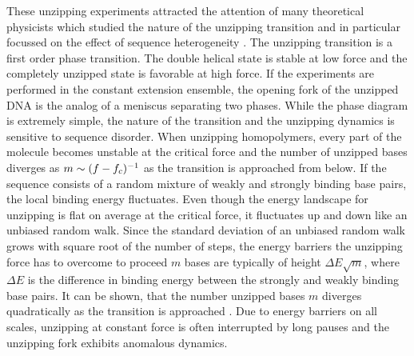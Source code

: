 These unzipping experiments attracted the attention of many theoretical physicists which
studied the nature of the unzipping transition \cite{Lubensky_PRL_00} and in particular
focussed on the effect of sequence heterogeneity \cite{Lubensky_PRE_02,Cocco_PRE_02,Danilowicz_PNAS_03}.
The unzipping transition is a first order phase transition. The double helical state is 
stable at low force and the completely unzipped state is favorable at high force. If the experiments
are performed in the constant extension ensemble, the opening fork of the unzipped DNA
is the analog of a meniscus separating two phases. While the phase diagram is extremely simple,
the nature of the transition and the unzipping dynamics is sensitive to sequence disorder.
When unzipping homopolymers, every part of the molecule becomes unstable at the critical force
and  the number of unzipped bases diverges as $m\sim (f-{f_c})^{-1}$ as the
transition is approached from below.  If the sequence consists of a random mixture of weakly and
strongly binding base pairs, the local binding energy fluctuates. Even though the energy landscape 
for unzipping is flat on average at the critical force, it fluctuates up and down like an 
unbiased random walk. Since the standard deviation of an unbiased random walk grows with square
root of the number of steps, the energy barriers the unzipping force has to overcome to proceed
$m$ bases are typically of height $\Delta E\sqrt{m}$, where $\Delta E$ is the difference in binding 
energy between the strongly and weakly binding base pairs.
It can be shown, that the number unzipped bases $m$ diverges 
quadratically as the transition is approached \cite{Lubensky_PRL_00}. 
Due to energy barriers on all scales, unzipping at constant force is often interrupted by long pauses
and the unzipping fork exhibits anomalous dynamics.


